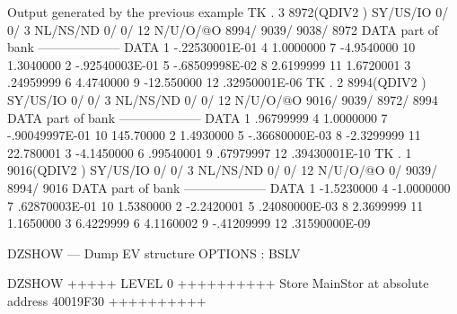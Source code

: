 \begin{landscapebody}
\begin{XMPt}{Output generated by the previous example}
 TK  .     3     8972(QDIV2   ) SY/US/IO    0/    0/   3 NL/NS/ND    0/    0/      12 N/U/O/@O    8994/    9039/    9038/    8972
DATA part of bank                                         --------------------                                                   
DATA      1    -.22530001E-01     4     1.0000000         7    -4.9540000        10     1.3040000                                
          2    -.92540003E-01     5    -.68509998E-02     8     2.6199999        11     1.6720001                                
          3     .24959999         6     4.4740000         9    -12.550000        12     .32950001E-06                            
 TK  .     2     8994(QDIV2   ) SY/US/IO    0/    0/   3 NL/NS/ND    0/    0/      12 N/U/O/@O    9016/    9039/    8972/    8994
DATA part of bank                                         --------------------                                                   
DATA      1     .96799999         4     1.0000000         7    -.90049997E-01    10     145.70000                                
          2     1.4930000         5    -.36680000E-03     8    -2.3299999        11     22.780001                                
          3    -4.1450000         6     .99540001         9     .67979997        12     .39430001E-10                            
 TK  .     1     9016(QDIV2   ) SY/US/IO    0/    0/   3 NL/NS/ND    0/    0/      12 N/U/O/@O       0/    9039/    8994/    9016
DATA part of bank                                         --------------------                                                   
DATA      1    -1.5230000         4    -1.0000000         7     .62870003E-01    10     1.5380000                                
          2    -2.2420001         5     .24080000E-03     8     2.3699999        11     1.1650000                                
          3     6.4229999         6     4.1160002         9    -.41209999        12     .31590000E-09                            
                                                                                                                                 
DZSHOW --- Dump EV structure                                                                       OPTIONS : BSLV                
                                                                                                                                 
DZSHOW  +++++ LEVEL     0 ++++++++++            Store  MainStor at absolute address 40019F30      ++++++++++                     
                                                                                                                                 

\end{XMPt}
\end{landscapebody}

